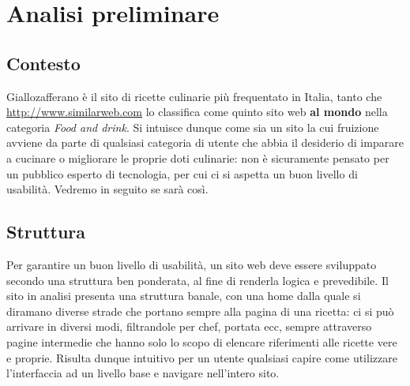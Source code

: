 \section{Analisi preliminare}

\subsection{Contesto}
Giallozafferano è il sito di ricette culinarie più frequentato in Italia, tanto che \url{http://www.similarweb.com} lo classifica come quinto sito web \textbf{al mondo} nella categoria \textit{ Food and drink}.
Si intuisce dunque come sia un sito la cui fruizione avviene da parte di qualsiasi categoria di utente che abbia il desiderio di imparare a cucinare o migliorare le proprie doti culinarie: non è sicuramente pensato per un pubblico esperto di tecnologia, per cui ci si aspetta un buon livello di usabilità. Vedremo in seguito se sarà così.

\subsection{Struttura}
Per garantire un buon livello di usabilità, un sito web deve essere sviluppato secondo una struttura ben ponderata, al fine di renderla logica e prevedibile. Il sito in analisi presenta una struttura banale, con una home dalla quale si diramano diverse strade che portano sempre alla pagina di una ricetta: ci si può arrivare in diversi modi, filtrandole per chef, portata ecc, sempre attraverso pagine intermedie che hanno solo lo scopo di elencare riferimenti alle ricette vere e proprie. Risulta dunque intuitivo per un utente qualsiasi capire come utilizzare l'interfaccia ad un livello base e navigare nell'intero sito.



